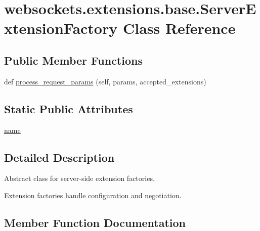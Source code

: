 \hypertarget{classwebsockets_1_1extensions_1_1base_1_1_server_extension_factory}{}\section{websockets.\+extensions.\+base.\+Server\+Extension\+Factory Class Reference}
\label{classwebsockets_1_1extensions_1_1base_1_1_server_extension_factory}
\subsection*{Public Member Functions}
\begin{DoxyCompactItemize}
\item 
def \hyperlink{classwebsockets_1_1extensions_1_1base_1_1_server_extension_factory_a642592850c0614a8e3855985d54cf9d7}{process\+\_\+request\+\_\+params} (self, params, accepted\+\_\+extensions)
\end{DoxyCompactItemize}
\subsection*{Static Public Attributes}
\begin{DoxyCompactItemize}
\item 
\hyperlink{classwebsockets_1_1extensions_1_1base_1_1_server_extension_factory_af3dc083d02a076fa1250c43b55735ebf}{name}
\end{DoxyCompactItemize}


\subsection{Detailed Description}
\begin{DoxyVerb}Abstract class for server-side extension factories.

Extension factories handle configuration and negotiation.\end{DoxyVerb}
 

\subsection{Member Function Documentation}
\mbox{\label{classwebsockets_1_1extensions_1_1base_1_1_server_extension_factory_a642592850c0614a8e3855985d54cf9d7}} 
